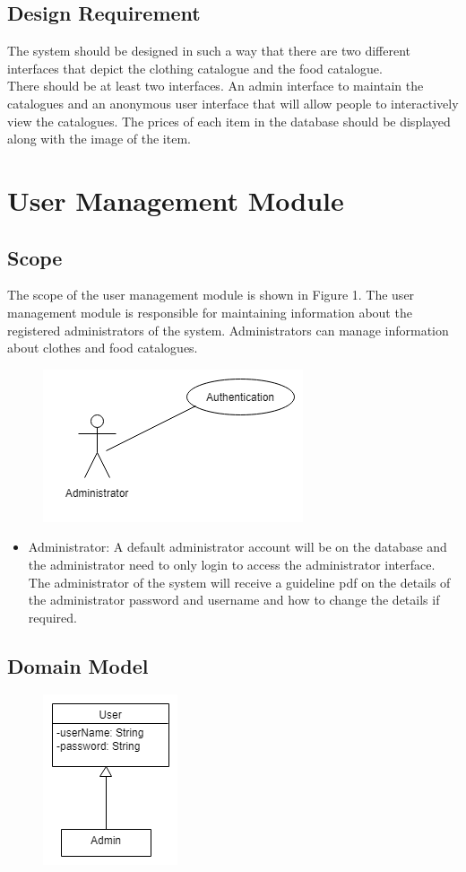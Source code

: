 \documentclass[12pt]{article}
\begin{document}
\subsection{Design Requirement}
The system should be designed in such a way that there are two different interfaces that depict the clothing
catalogue and the food catalogue.\\
There should be at least two interfaces. An admin interface to maintain the catalogues and an anonymous
user interface that will allow people to interactively view the catalogues.
The prices of each item in the database should be displayed along with the image of the item.

\section{User Management Module}
\subsection{Scope}
The scope of the user management module is shown in Figure 1. The user management module is responsible for maintaining information about the registered administrators of the system. Administrators can manage information about clothes and food catalogues. 
\begin{figure}[h]
\centering
\includegraphics[scale=1]{diagrams/use.png}
\end{figure}
\begin{itemize}
\item Administrator: A default administrator account will be on the database and the administrator need to only login to access the administrator interface. The administrator of the system will receive a guideline pdf on the details of the administrator password and username and how to change the details if required.
\end{itemize}

\subsection{Domain Model}
\begin{figure}[h]
\centering
\includegraphics[scale=1]{diagrams/usedom.png}
\end{figure}
\end{document}

